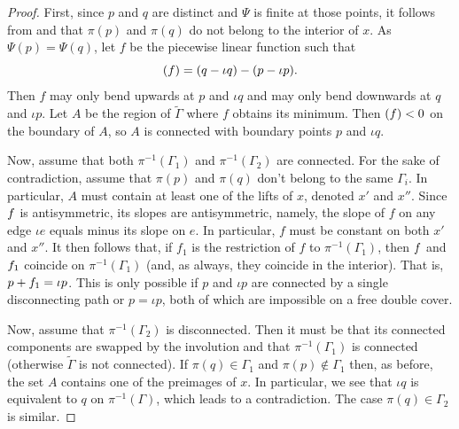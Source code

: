 \documentclass[11pt]{article}
\theoremstyle{definition}
\numberwithin{equation}{section}
\theoremstyle{definition}
\newcommand{\wt}[1]{\widetilde{#1}}
\let\ddiv\relax
\DeclareMathOperator{\ddiv}{div}
\begin{document}
\begin{proof}
First, since $p$ and $q$ are distinct and $\Psi$ is finite at those points, it follows from  and    that $\pi(p)$ and $\pi(q)$ do not belong to the interior of $x$.   
As $\Psi(p) = \Psi(q)$, let $f$ be the piecewise linear function such that 
    \[
    \ddiv(f) = (q - \iota q) - (p-\iota p). 
    \]
    Then $f$ may only bend upwards at $p$ and $\iota q$ and may only bend downwards at $q$ and $\iota p$. Let $A$ be the region of $\wt\Gamma$ where $f$ obtains its minimum. Then $\ddiv(f) < 0$ on the boundary of $A$, so $A$ is connected with boundary points $p$ and $\iota q$. 
    
    Now, assume that both $\pi^{-1}({\Gamma_1})$ and $\pi^{-1}(\Gamma_2)$ are connected. For the sake of contradiction, assume that  $\pi(p)$ and $\pi(q)$ don't belong to the same  $\Gamma_i$.
    In particular,  $A$  must contain at least one of the lifts of $x$, denoted $x'$ and $x''$. Since $\ddiv f$ is antisymmetric, its slopes are antisymmetric, namely, the slope of $f$ on any edge $\iota e$ equals minus its slope on $e$. In particular, $f$ must be constant on both $x'$ and $x''$.  It then follows that, if $f_1$ is the restriction of $f$ to $\pi^{-1}(\Gamma_1)$, then $\ddiv f$ and $\ddiv f_1$ coincide on $\pi^{-1}(\Gamma_1)$ (and, as always, they coincide in the interior). That is, 
     $p + \ddiv f_1 = \iota p$. This is only possible if  $p$ and $\iota p$ are connected by a single disconnecting path or $p = \iota p$, both of which are impossible on a free double cover. 

Now, assume that  $\pi^{-1}(\Gamma_2)$ is disconnected. Then it must be that its connected components are swapped by the involution and that $\pi^{-1}(\Gamma_1)$ is connected (otherwise $\wt\Gamma$ is not connected).  
If $\pi(q)\in\Gamma_1$ and $\pi(p)\notin\Gamma_1$ then, as before, the set  $A$ contains one of the preimages of $x$. In particular, we see that $\iota q$ is equivalent to $q$ on $\pi^{-1}(\Gamma)$, which leads to a contradiction. The case $\pi(q)\in\Gamma_2$ is similar. 
\end{proof}
\end{document}
